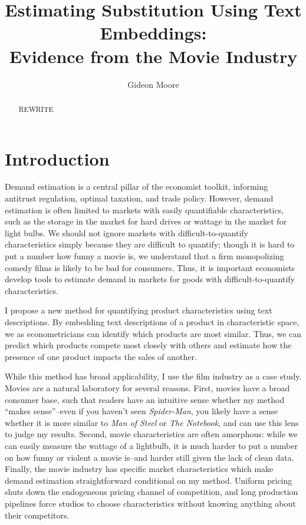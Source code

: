 \documentclass{article}
\author{Gideon Moore}
\title{Estimating Substitution Using Text Embeddings: \\ Evidence from the Movie Industry}
\begin{document}
\maketitle 

\begin{abstract}
    REWRITE
\end{abstract}

\section{Introduction}

Demand estimation is a central pillar of the economist toolkit, informing antitrust regulation, optimal taxation, and trade policy. However, demand estimation is often limited to markets with easily quantifiable characteristics, such as the storage in the market for hard drives or wattage in the market for light bulbs. We should not ignore markets with difficult-to-quantify characteristics simply because they are difficult to quantify; though it is hard to put a number how funny a movie is, we understand that a firm monopolizing comedy films is likely to be bad for consumers. Thus, it is important economists develop tools to estimate demand in markets for goods with difficult-to-quantify characteristics.

I propose a new method for quantifying product characteristics using text descriptions. By embedding text descriptions of a product in characteristic space, we as econometricians can identify which products are most similar. Thus, we can predict which products compete most closely with others and estimate how the presence of one product impacts the sales of another.

While this method has broad applicability, I use the film industry as a case study. Movies are a natural laboratory for several reasons. First, movies have a broad consumer base, such that readers have an intuitive sense whether my method ``makes sense''--even if you haven't seen \emph{Spider-Man}, you likely have a sense whether it is more similar to \emph{Man of Steel} or \emph{The Notebook}, and can use this lens to judge my results. Second, movie characteristics are often amorphous: while we can easily measure the wattage of a lightbulb, it is much harder to put a number on how funny or violent a movie is--and harder still given the lack of clean data. Finally, the movie industry has specific market characteristics which make demand estimation straightforward conditional on my method. Uniform pricing shuts down the endogeneous pricing channel of competition, and long production pipelines force studios to choose characteristics without knowing anything about their competitors.
\end{document}
